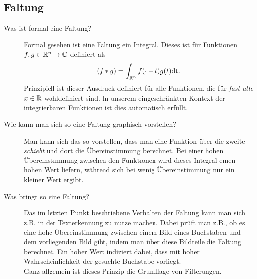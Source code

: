 \subsection{Faltung}
\begin{description}
  \item[Was ist formal eine Faltung?]
    Formal gesehen ist eine Faltung ein Integral. Dieses ist für Funktionen $f, g\in\mathbb{R}^n \to \mathbb{C}$ definiert als
    $$ (f*g) = \int_{\mathbb{R}^n} f(\cdot - t)g(t)\text{dt}. $$
    Prinzipiell ist dieser Ausdruck definiert für alle Funktionen, die für \emph{fast alle} $x\in\mathbb{R}$ wohldefiniert
    sind. In unserem eingeschränkten Kontext der integrierbaren  Funktionen ist dies automatisch erfüllt.
  \item[Wie kann man sich so eine Faltung graphisch vorstellen?]
    Man kann sich das so vorstellen, dass man eine Funktion über die zweite \emph{schiebt} und dort die 
    Übereinstimmung berechnet. Bei einer hohen Übereinstimmung zwischen den Funktionen wird dieses Integral einen
    hohen Wert liefern, während sich bei wenig Übereinstimmung nur ein kleiner Wert ergibt.
  \item[Was bringt so eine Faltung?]
    Das im letzten Punkt beschriebene Verhalten der Faltung kann man sich z.B. in der Texterkennung zu nutze machen.
    Dabei prüft man z.B., ob es eine hohe Übereinstimmung zwischen einem Bild eines Buchstaben und dem vorliegenden
    Bild gibt, indem man über diese Bildteile die Faltung berechnet. Ein hoher Wert indiziert dabei, dass mit hoher
    Wahrscheinlichkeit der gesuchte Buchstabe vorliegt.\\
    Ganz allgemein ist dieses Prinzip die Grundlage von Filterungen.
\end{description}

